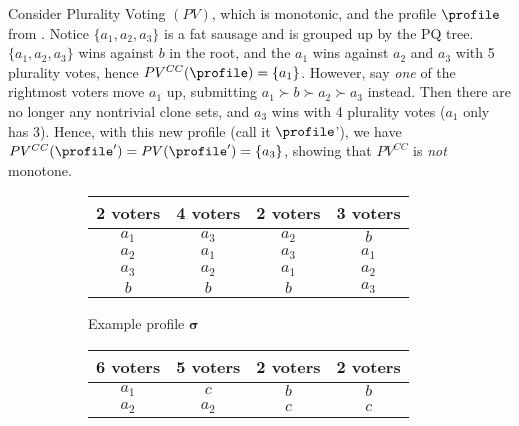\begin{example}\label{ex:counter-mono}
    Consider Plurality Voting $(PV)$, which is monotonic, and the profile $\profile$ from . Notice $\{a_1,a_2,a_3\}$ is a fat sausage and is grouped up by the PQ tree. $\{a_1,a_2,a_3\}$ wins against $b$ in the root, and the $a_1$ wins against $a_2$ and $a_3$ with 5 plurality votes, hence $PV^{CC}(\profile)=\{a_1\}$. However, say \emph{one} of the rightmost voters move $a_1$ up, submitting $a_1 \succ b \succ a_2 \succ a_3$ instead. Then there are no longer any nontrivial clone sets, and $a_3$ wins with 4 plurality votes ($a_1$ only has 3). Hence, with this new profile (call it $\profile$'), we have $PV^{CC}(\profile')=PV(\profile')=\{a_3\}$, showing that $PV^{CC}$ is \emph{not} monotone.
\end{example}
\begin{figure}
    \centering
    \begin{subfigure}{.49\textwidth}
        \centering
        \begin{tabular}{|c|c|c|c|}
            \hline
            2 voters & 4 voters & 2 voters & 3 voters \\
            \hline
            \cellcolor{yellow!25}$a_1$ & \cellcolor{green!25}$a_3$ & \cellcolor{orange!25}$a_2$ & \cellcolor{blue!25}$b$ \\ \hline
            \cellcolor{orange!25}$a_2$ & \cellcolor{yellow!25}$a_1$ & \cellcolor{green!25}$a_3$ & \cellcolor{yellow!25}$a_1$ \\ \hline
            \cellcolor{green!25}$a_3$ & \cellcolor{orange!25}$a_2$ & \cellcolor{yellow!25}$a_1$ & \cellcolor{orange!25}$a_2$ \\ \hline
            \cellcolor{blue!25}$b$ & \cellcolor{blue!25}$b$ & \cellcolor{blue!25}$b$ & \cellcolor{green!25}$a_3$ \\
            \hline
        \end{tabular} \caption{Example profile $\boldsymbol{\sigma}$}\label{fig:counter_mono}
    \end{subfigure}
    \begin{subfigure}{.49\textwidth}
        \centering
        \begin{tabular}{|c|c|c|c|}
            \hline
            6 voters & 5 voters & 2 voters & 2 voters \\ \hline
            \cellcolor{yellow!25} $a_1$ & \cellcolor{blue!25} $c$ & \cellcolor{green!25} $b$ & \cellcolor{green!25} $b$ \\ \hline
            \cellcolor{red!25} $a_2$ & \cellcolor{red!25} $a_2$ & \cellcolor{blue!25} $c$ & \cellcolor{blue!25} $c$ \\ \hline

\end{tabular}
\end{subfigure}
\end{figure}
